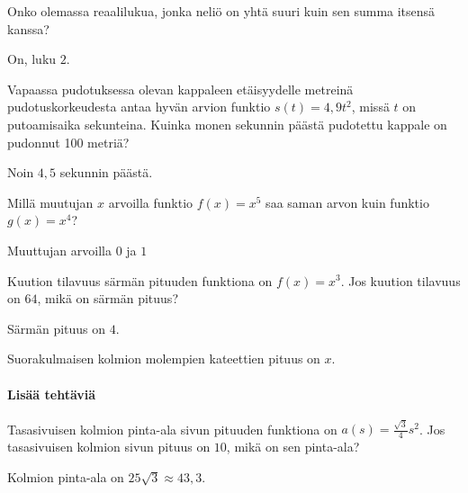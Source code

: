\begin{tehtavasivu}
\begin{tehtava}
Onko olemassa reaalilukua, jonka neliö on yhtä suuri kuin sen summa itsensä kanssa?
\begin{vastaus}
On, luku $2$.
\end{vastaus}
\end{tehtava}


\begin{tehtava}
Vapaassa pudotuksessa olevan kappaleen etäisyydelle metreinä pudotuskorkeudesta antaa hyvän arvion funktio $ s(t)=4,9t^{2}$, missä $t$ on putoamisaika sekunteina. Kuinka monen sekunnin päästä pudotettu kappale on pudonnut 100 metriä?
\begin{vastaus}
Noin $4,5$ sekunnin päästä.
\end{vastaus}
\end{tehtava}

\begin{tehtava}
Millä muutujan $x$ arvoilla funktio $ f(x)=x^5$ saa saman arvon kuin funktio $ g(x)=x^4$?
\begin{vastaus}
Muuttujan arvoilla $0$ ja $1$
\end{vastaus}
\end{tehtava}

\begin{tehtava}
Kuution tilavuus särmän pituuden funktiona on $f(x) = x^3$. Jos kuution tilavuus on $64$, mikä on särmän pituus?
\begin{vastaus}
Särmän pituus on $4$.
\end{vastaus}
\end{tehtava}

\begin{tehtava}
Suorakulmaisen kolmion molempien kateettien pituus on $x$.
\begin{vastaus}
\end{vastaus}
\end{tehtava}

\paragraph*{Lisää tehtäviä}

\begin{tehtava}
Tasasivuisen kolmion pinta-ala sivun pituuden funktiona on $a(s) = \frac{\sqrt{3}}{4}s^{2}$. Jos tasasivuisen kolmion sivun pituus on $10$, mikä on sen pinta-ala?
\begin{vastaus}
Kolmion pinta-ala on $25\sqrt{3}\approx43,3$.
\end{vastaus}
\end{tehtava}



\end{tehtavasivu}
